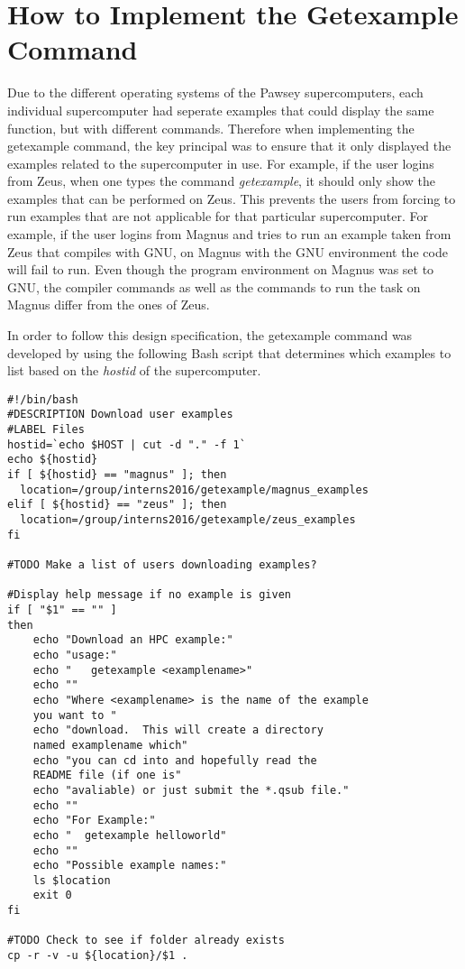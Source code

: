 \section{How to Implement the Getexample Command}

Due to the different operating systems of the Pawsey supercomputers, each individual supercomputer had seperate examples that could display the same
function, but with different commands. Therefore when implementing the getexample command, the key principal was to ensure that it only displayed the
examples related to the supercomputer in use. For example, if the user logins from Zeus, when one types the command \emph{getexample}, it should only
show the examples that can be performed on Zeus. This prevents the users from forcing to run examples that are not applicable for that particular 
supercomputer. For example, if the user logins from Magnus and tries to run an example taken from Zeus that compiles with GNU, on Magnus with the GNU 
environment the code will fail to run. Even though the program environment on Magnus was set to GNU, the compiler commands as well as the commands to
run the task on Magnus differ from the ones of Zeus.

In order to follow this design specification, the getexample command was developed by using the following Bash script that determines which examples to
list based on the \emph{hostid} of the supercomputer.    


\begin{tcolorbox}
\begin{Verbatim}[fontsize=\scriptsize]
#!/bin/bash
#DESCRIPTION Download user examples
#LABEL Files
hostid=`echo $HOST | cut -d "." -f 1`
echo ${hostid}
if [ ${hostid} == "magnus" ]; then 
  location=/group/interns2016/getexample/magnus_examples
elif [ ${hostid} == "zeus" ]; then
  location=/group/interns2016/getexample/zeus_examples
fi

#TODO Make a list of users downloading examples?

#Display help message if no example is given
if [ "$1" == "" ]
then
    echo "Download an HPC example:"
    echo "usage:"
    echo "   getexample <examplename>"
    echo ""
    echo "Where <examplename> is the name of the example 
    you want to "
    echo "download.  This will create a directory 
    named examplename which"
    echo "you can cd into and hopefully read the 
    README file (if one is"
    echo "avaliable) or just submit the *.qsub file."
    echo ""
    echo "For Example:"
    echo "  getexample helloworld"
    echo ""
    echo "Possible example names:"
    ls $location 
    exit 0
fi

#TODO Check to see if folder already exists
cp -r -v -u ${location}/$1 .
\end{Verbatim}
\end{tcolorbox}
